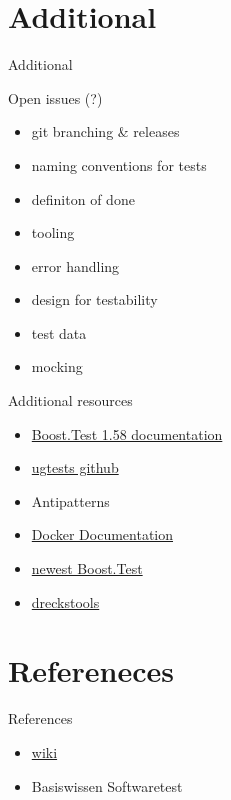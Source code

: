 \documentclass{beamer}
\newcommand{\sectiontitle}[1]{
    \section{#1}
    \begin{frame}
        \centering
        \LARGE{#1}
    \end{frame}
}
\begin{document}
    \sectiontitle{Additional}
    \begin{frame}{Open issues (?)}
        \begin{itemize}
            \item git branching \& releases
            \item naming conventions for tests
            \item definiton of done
            \item tooling
            \item error handling 
            \item design for testability
            \item test data
            \item mocking
        \end{itemize}
    \end{frame}
    \begin{frame}{Additional resources}
            \begin{itemize}
                \item \href{https://www.boost.org/doc/libs/1_58_0/libs/test/}{Boost.Test 1.58 documentation}
                \item \href{https://github.com/UG4/plugin_UGTest}{ugtests github}
                \item Antipatterns
                \item \href{https://docs.docker.com/}{Docker Documentation}
                \item \href{https://www.boost.org/doc/libs/1_73_0/libs/test/}{newest Boost.Test} %
                \item \href{https://www.dreckstool.de}{dreckstools}
            \end{itemize}
    \end{frame}

    \section{Refereneces}
    \begin{frame}{References}
        \begin{itemize}
            \item \href{https://en.wikipedia.org/wiki/Software_testing}{wiki}
            \item Basiswissen Softwaretest
        \end{itemize}
    \end{frame}
\end{document}
